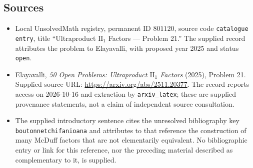 \documentclass[11pt]{article}
\begin{document}
\subsection{Sources}
\begin{itemize}
\item Local UnsolvedMath registry, permanent ID \(801120\), source code \texttt{catalogue entry}, title ``Ultraproduct \(\mathrm{II}_1\) Factors --- Problem 21.'' The supplied record attributes the problem to Elayavalli, with proposed year 2025 and status \texttt{open}.
\item Elayavalli, \emph{50 Open Problems: Ultraproduct \(\mathrm{II}_1\) Factors} (2025), Problem 21. Supplied source URL: \url{https://arxiv.org/abs/2511.20377}. The record reports access on 2026-10-16 and extraction by \texttt{arxiv\_latex}; these are supplied provenance statements, not a claim of independent source consultation.
\item The supplied introductory sentence cites the unresolved bibliography key \texttt{boutonnetchifanioana} and attributes to that reference the construction of many McDuff factors that are not elementarily equivalent. No bibliographic entry or link for this reference, nor the preceding material described as complementary to it, is supplied.
\end{itemize}
\end{document}
